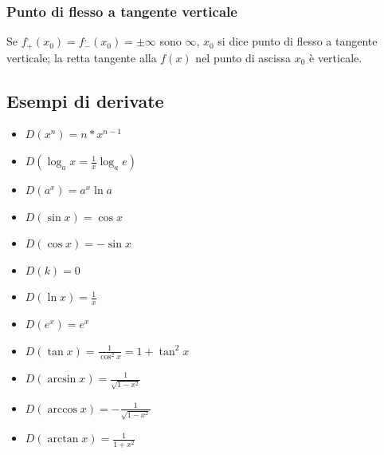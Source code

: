 \subsubsection{Punto di flesso a tangente verticale}
Se $f^,_+(x_0)=f^,_-(x_0)=\pm \infty$ sono $\infty$, $x_0$ si dice punto di
flesso a tangente verticale; la retta tangente alla $f(x)$ nel punto di ascissa
$x_0$ è verticale.
\subsection{Esempi di derivate}
\begin{multicols}{2}
	\begin{itemize}
		\item $D(x^n)=n*x^{n-1}$
		\item $D(\log_ax=\frac{1}{x}\log_a e)$
		\item $D(a^x)=a^x\ln a$
		\item $D(\sin x)=\cos x$
		\item $D(\cos x)=-\sin x$
		\item $D(k)=0$
		\item $D(\ln x)=\frac{1}{x}$
		\item $D(e^x)=e^x$
		\item $D(\tan x)=\frac{1}{\cos^2 x}=1+\tan^2x$
		\item $D(\arcsin x)=\frac{1}{\sqrt{1-x^2}}$
		\item $D(\arccos x)=-\frac{1}{\sqrt{1-x^2}}$
		\item $D(\arctan x)=\frac{1}{1+x^2}$
	\end{itemize}
\end{multicols}
